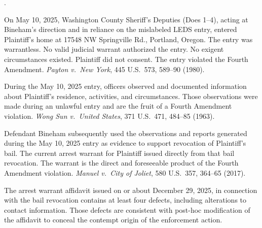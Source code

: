 \documentclass[12pt,letterpaper]{article}
\newcounter{complaintpara}
\newenvironment{paras}{%
	\begin{list}{\arabic{complaintpara}.}{%
			\setlength{\leftmargin}{0.5in}%
			\setlength{\labelwidth}{0.4in}%
			\setlength{\labelsep}{0.1in}%
			\setlength{\itemsep}{0pt}%
			\setlength{\parsep}{0pt}%
			\setlength{\topsep}{6pt}%
		}%
	}{%
	\end{list}%
}
\begin{document}
\begin{paras}
		\item\label{fact:homeentry} On May 10, 2025, Washington County
		Sheriff's Deputies (Does 1--4), acting at Bineham's direction
		and in reliance on the mislabeled LEDS entry, entered
		Plaintiff's home at 17548 NW Springville Rd., Portland,
		Oregon. The entry was warrantless. No valid judicial warrant
		authorized the entry. No exigent circumstances existed.
		Plaintiff did not consent. The entry violated the Fourth
		Amendment. \textit{Payton v.\ New York}, 445 U.S.\ 573,
		589--90 (1980).
		
		\item\label{fact:observed} During the May 10, 2025 entry,
		officers observed and documented information about Plaintiff's
		residence, activities, and circumstances. Those observations
		were made during an unlawful entry and are the fruit of a
		Fourth Amendment violation. \textit{Wong Sun v.\ United
			States}, 371 U.S.\ 471, 484--85 (1963).
		
		\item\label{fact:bailrevoke} Defendant Bineham subsequently used
		the observations and reports generated during the May 10, 2025
		entry as evidence to support revocation of Plaintiff's bail.
		The current arrest warrant for Plaintiff issued directly from
		that bail revocation. The warrant is the direct and
		foreseeable product of the Fourth Amendment violation.
		\textit{Manuel v.\ City of Joliet}, 580 U.S.\ 357, 364--65
		(2017).
		
		\item\label{fact:warrantaffidavit} The arrest warrant affidavit
		issued on or about December 29, 2025, in connection with the
		bail revocation contains at least four defects, including
		alterations to contact information. Those defects are
		consistent with post-hoc modification of the affidavit to
		conceal the contempt origin of the enforcement action.
		
	\end{paras}
\end{document}
